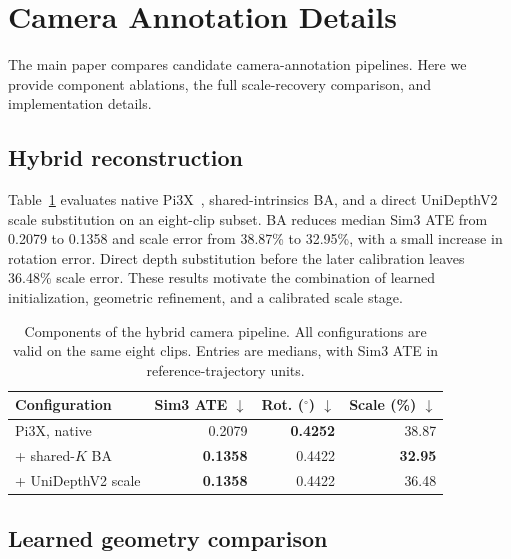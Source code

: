 \section{Camera Annotation Details}
\label{sec:supp_camera}

The main paper compares candidate camera-annotation pipelines.
Here we provide component ablations, the full scale-recovery comparison, and implementation details.

\subsection{Hybrid reconstruction}

Table~\ref{tab:supp_hybrid} evaluates native Pi3X~\cite{wang2026pi3permutationequivariantvisualgeometry}, shared-intrinsics BA, and a direct UniDepthV2~\cite{piccinelli2025unidepthv2} scale substitution on an eight-clip subset.
BA reduces median Sim3 ATE from 0.2079 to 0.1358 and scale error from 38.87\% to 32.95\%, with a small increase in rotation error.
Direct depth substitution before the later calibration leaves 36.48\% scale error.
These results motivate the combination of learned initialization, geometric refinement, and a calibrated scale stage.

\begin{table}[htbp]
    \centering
    \caption{Components of the hybrid camera pipeline. All configurations are valid on the same eight clips. Entries are medians, with Sim3 ATE in reference-trajectory units.}
    \label{tab:supp_hybrid}
    \small
    \setlength{\tabcolsep}{3pt}
    \begin{tabular}{lrrr}
        \toprule
        Configuration & Sim3 ATE $\downarrow$ & Rot. ($^\circ$) $\downarrow$ & Scale (\%) $\downarrow$ \\
        \midrule
        Pi3X, native & 0.2079 & \textbf{0.4252} & 38.87 \\
        + shared-$K$ BA & \textbf{0.1358} & 0.4422 & \textbf{32.95} \\
        \quad + UniDepthV2 scale & \textbf{0.1358} & 0.4422 & 36.48 \\
        \bottomrule
    \end{tabular}
\end{table}

\subsection{Learned geometry comparison}

